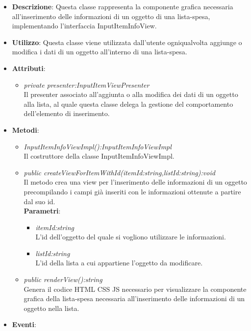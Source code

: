 \begin{itemize}
\item \textbf{Descrizione}: Questa classe rappresenta la componente grafica necessaria all'inserimento delle informazioni di un oggetto di una lista-spesa, implementando l'interfaccia InputItemInfoView.
\item \textbf{Utilizzo}: Questa classe viene utilizzata dall'utente ogniqualvolta aggiunge o modifica i dati di un oggetto all'interno di una lista-spesa.
\item \textbf{Attributi}:
	\begin{itemize}
	\item \textit{private presenter:InputItemViewPresenter}\\
	Il presenter associato all'aggiunta o alla modifica dei dati di un oggetto alla lista, al quale questa classe delega la gestione del comportamento dell'elemento di inserimento.
	\end{itemize}
\item \textbf{Metodi}:
	\begin{itemize}
	\item \textit{InputItemInfoViewImpl():InputItemInfoViewImpl}\\
	Il costruttore della classe InputItemInfoViewImpl.
	\item \textit{public createViewForItemWithId(itemId:string,listId:string):void}\\
	Il metodo crea una view per l'inserimento delle informazioni di un oggetto precompilando i campi già inseriti con le informazioni ottenute a partire dal suo id.
			\\ \textbf{Parametri}: \begin{itemize}
			\item \textit{itemId:string}\\
			L'id dell'oggetto del quale si vogliono utilizzare le informazioni.
			\item \textit{listId:string}\\
			L'id della lista a cui appartiene l'oggetto da modificare.
			\end{itemize} 
	\item \textit{public renderView():string}\\
	Genera il codice HTML CSS JS necessario per visualizzare la componente grafica della lista-spesa necessaria all'inserimento delle informazioni di un oggetto nella lista.
	\end{itemize}
\item \textbf{Eventi}:
\end{itemize}

